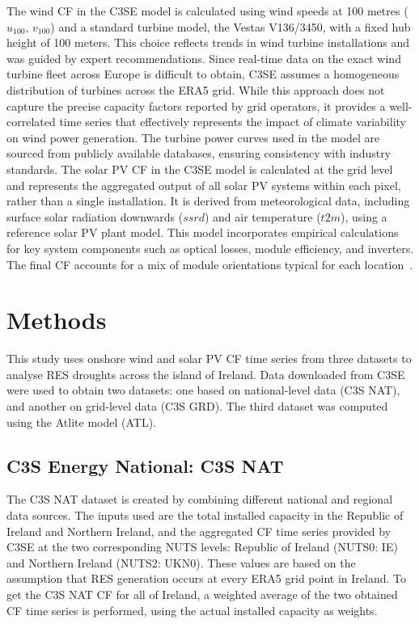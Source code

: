 \documentclass[preprint, 12pt]{elsarticle}
\begin{document}
The wind CF in the C3SE model is calculated using wind speeds at 100 metres ($u_{100}$, $v_{100}$) and a standard turbine model, the Vestas V136/3450, with a fixed hub height of 100 meters. This choice reflects trends in wind turbine installations and was guided by expert recommendations. Since real-time data on the exact wind turbine fleet across Europe is difficult to obtain, C3SE assumes a homogeneous distribution of turbines across the ERA5 grid. While this approach does not capture the precise capacity factors reported by grid operators, it provides a well-correlated time series that effectively represents the impact of climate variability on wind power generation. The turbine power curves used in the model are sourced from publicly available databases, ensuring consistency with industry standards. The solar PV CF in the C3SE model is calculated at the grid level and represents the aggregated output of all solar PV systems within each pixel, rather than a single installation. It is derived from meteorological data, including surface solar radiation downwards ($ssrd$) and air temperature ($t2m$), using a reference solar PV plant model. This model incorporates empirical calculations for key system components such as optical losses, module efficiency, and inverters. The final CF accounts for a mix of module orientations typical for each location~\citep{saintdrenan2018solar}. 

\section{Methods}
\label{sec:methods}

This study uses onshore wind and solar PV CF time series from three datasets to analyse RES droughts across the island of Ireland. Data downloaded from C3SE were used to obtain two datasets: one based on national-level data (C3S NAT), and another on grid-level data (C3S GRD). The third dataset was computed using the Atlite model (ATL).

\subsection{C3S Energy National: C3S NAT}
\label{sec:c3se_n}

The C3S NAT dataset is created by combining different national and regional data sources. The inputs used are the total installed capacity in the Republic of Ireland and Northern Ireland, and the aggregated CF time series provided by C3SE at the two corresponding NUTS levels: Republic of Ireland (NUTS0: IE) and Northern Ireland (NUTS2: UKN0). These values are based on the assumption that RES generation occurs at every ERA5 grid point in Ireland. To get the C3S NAT CF for all of Ireland, a weighted average of the two obtained CF time series is performed, using the actual installed capacity as weights.
\end{document}
